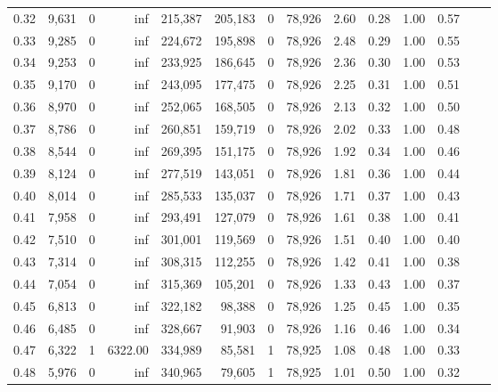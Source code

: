 \begin{tabular}{rrrrrrrrrrrrrr}
0.32 &  9,631 &      0 &      inf &  215,387 &  205,183 &       0 &  78,926 &  2.60 &  0.28 &  1.00 &      0.57 \\
0.33 &  9,285 &      0 &      inf &  224,672 &  195,898 &       0 &  78,926 &  2.48 &  0.29 &  1.00 &      0.55 \\
0.34 &  9,253 &      0 &      inf &  233,925 &  186,645 &       0 &  78,926 &  2.36 &  0.30 &  1.00 &      0.53 \\
0.35 &  9,170 &      0 &      inf &  243,095 &  177,475 &       0 &  78,926 &  2.25 &  0.31 &  1.00 &      0.51 \\
0.36 &  8,970 &      0 &      inf &  252,065 &  168,505 &       0 &  78,926 &  2.13 &  0.32 &  1.00 &      0.50 \\
0.37 &  8,786 &      0 &      inf &  260,851 &  159,719 &       0 &  78,926 &  2.02 &  0.33 &  1.00 &      0.48 \\
0.38 &  8,544 &      0 &      inf &  269,395 &  151,175 &       0 &  78,926 &  1.92 &  0.34 &  1.00 &      0.46 \\
0.39 &  8,124 &      0 &      inf &  277,519 &  143,051 &       0 &  78,926 &  1.81 &  0.36 &  1.00 &      0.44 \\
0.40 &  8,014 &      0 &      inf &  285,533 &  135,037 &       0 &  78,926 &  1.71 &  0.37 &  1.00 &      0.43 \\
0.41 &  7,958 &      0 &      inf &  293,491 &  127,079 &       0 &  78,926 &  1.61 &  0.38 &  1.00 &      0.41 \\
0.42 &  7,510 &      0 &      inf &  301,001 &  119,569 &       0 &  78,926 &  1.51 &  0.40 &  1.00 &      0.40 \\
0.43 &  7,314 &      0 &      inf &  308,315 &  112,255 &       0 &  78,926 &  1.42 &  0.41 &  1.00 &      0.38 \\
0.44 &  7,054 &      0 &      inf &  315,369 &  105,201 &       0 &  78,926 &  1.33 &  0.43 &  1.00 &      0.37 \\
0.45 &  6,813 &      0 &      inf &  322,182 &   98,388 &       0 &  78,926 &  1.25 &  0.45 &  1.00 &      0.35 \\
0.46 &  6,485 &      0 &      inf &  328,667 &   91,903 &       0 &  78,926 &  1.16 &  0.46 &  1.00 &      0.34 \\
0.47 &  6,322 &      1 &  6322.00 &  334,989 &   85,581 &       1 &  78,925 &  1.08 &  0.48 &  1.00 &      0.33 \\
0.48 &  5,976 &      0 &      inf &  340,965 &   79,605 &       1 &  78,925 &  1.01 &  0.50 &  1.00 &      0.32 \\

\end{tabular}

